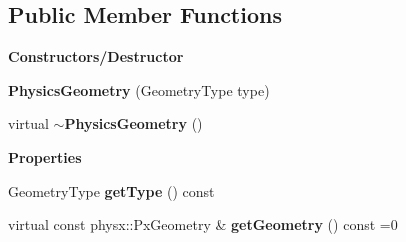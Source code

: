 \subsection*{Public Member Functions}
\begin{Indent}\textbf{ Constructors/\+Destructor}\par
\begin{DoxyCompactItemize}
\item 
\mbox{\label{classrev_1_1_physics_geometry_a279ead66e673c960f6810c6b59eae38a}} 
{\bfseries Physics\+Geometry} (Geometry\+Type type)
\item 
\mbox{\label{classrev_1_1_physics_geometry_aecb4e07f21547af65501619be7486550}} 
virtual {\bfseries $\sim$\+Physics\+Geometry} ()
\end{DoxyCompactItemize}
\end{Indent}
\begin{Indent}\textbf{ Properties}\par
\begin{DoxyCompactItemize}
\item 
\mbox{\label{classrev_1_1_physics_geometry_ac30b7c69fd9c33907ffe71f8b5e46611}} 
Geometry\+Type {\bfseries get\+Type} () const
\item 
\mbox{\label{classrev_1_1_physics_geometry_a7f3608b2f6710dca4442b6f15dd06b76}} 
virtual const physx\+::\+Px\+Geometry \& {\bfseries get\+Geometry} () const =0
\end{DoxyCompactItemize}
\end{Indent}
